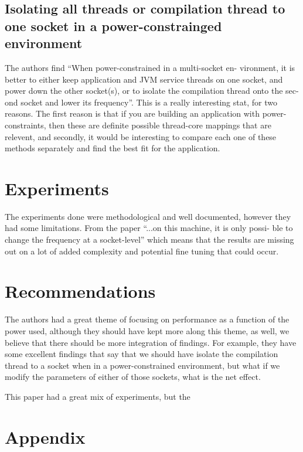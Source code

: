 \documentclass[conference]{IEEEtran}
\begin{document}
\subsection{Isolating all threads or compilation thread to one socket in a power-constrainged environment}

The authors find ``When power-constrained in a multi-socket en- vironment, it is better to either keep application and JVM service threads on one socket, and power down the other socket(s), or to isolate the compilation thread onto the sec- ond socket and lower its frequency''. This is a really interesting stat, for two reasons.  The first reason is that if you are building an application with power-constraints, then these are definite possible thread-core mappings that are relevent, and secondly, it would be interesting to compare each one of these methods separately and find the best fit for the application.  

\section{Experiments}

The experiments done were methodological and well documented, however they had some limitations.  From the paper ``...on this machine, it is only possi- ble to change the frequency at a socket-level'' which means that the results are missing out on a lot of added complexity and potential fine tuning that could occur.  

\section{Recommendations}
The authors had a great theme of focusing on performance as a function of the power used, although they should have kept more along this theme, as well, we believe that there should be more integration of findings.  For example, they have some excellent findings that say that we should have isolate the compilation thread to a socket when in a power-constrained environment, but what if we modify the parameters of either of those sockets, what is the net effect.

This paper had a great mix of experiments, but the 

\section{Appendix}



\balance



\end{document}

